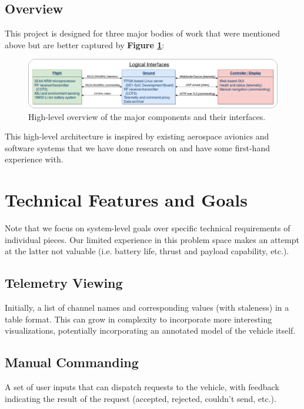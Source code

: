 \documentclass{article}
\begin{document}
\subsection{Overview}

This project is designed for three major bodies of work that were
mentioned above but are better captured by \textbf{Figure \ref{fig:high-level}}:

\begin{figure}[H]
	\centering
	\includegraphics[width=\linewidth]{../src/im/top_level}
	\caption{High-level overview of the major components and
		their interfaces.}
	\label{fig:high-level}
\end{figure}

\noindent This high-level architecture is inspired by existing aerospace
avionics and software systems that we have done research on
and have some first-hand experience with.

\section{Technical Features and Goals}

Note that we focus on system-level goals over specific technical requirements
of individual pieces. Our limited experience in this problem space
makes an attempt at the latter not valuable (i.e. battery life, thrust and
payload capability, etc.).

\subsection{Telemetry Viewing}

Initially, a list of channel names and corresponding values (with staleness)
in a table format. This can grow in complexity to incorporate more interesting
visualizations, potentially incorporating an annotated model of the vehicle
itself.

\subsection{Manual Commanding}

A set of user inputs that can dispatch requests to the vehicle, with feedback
indicating the result of the request (accepted, rejected, couldn't send, etc.).
\end{document}
